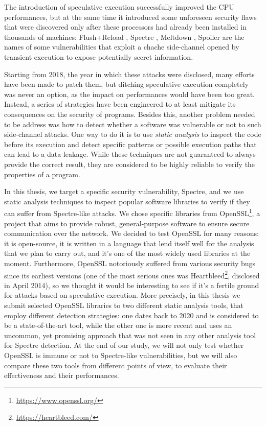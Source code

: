 \documentclass[12pt,a4paper]{book}
\theoremstyle{definition}
\begin{document}
	The introduction of speculative execution successfully improved the CPU performances, but at the same time it introduced some unforeseen security flaws that were discovered only after these processors had already been installed in thousands of machines: Flush+Reload \cite{Yarom2014}, Spectre \cite{Kocher2019}, Meltdown \cite{Lipp2018}, Spoiler \cite{Islam2019} are the names of some vulnerabilities that exploit a chache side-channel opened by transient execution to expose potentially secret information.
	
	Starting from 2018, the year in which these attacks were disclosed, many efforts have been made to patch them, but ditching speculative execution completely was never an option, as the impact on performances would have been too great. Instead, a series of strategies have been engineered to at least mitigate its consequences on the security of programs. Besides this, another problem needed to be address was how to detect whether a software was vulnerable or not to such side-channel attacks. One way to do it is to use \textit{static analysis} to inspect the code before its execution and detect specific patterns or possible execution paths that can lead to a data leakage. While these techniques are not guaranteed to always provide the correct result, they are considered to be highly reliable to verify the properties of a program.
	
	In this thesis, we target a specific security vulnerability, Spectre, and we use static analysis techniques to inspect popular software libraries to verify if they can suffer from Spectre-like attacks. We chose specific libraries from OpenSSL\footnote{\url{https://www.openssl.org/}}, a project that aims to provide robust, general-purpose software to ensure secure communication over the network. We decided to test OpenSSL for many reasons: it is open-source, it is written in a language that lend itself well for the analysis that we plan to carry out, and it's one of the most widely used libraries at the moment. Furthermore, OpenSSL notoriously suffered from various security bugs since its earliest versions (one of the most serious ones was Heartbleed\footnote{\url{https://heartbleed.com/}}, disclosed in April 2014), so we thought it would be interesting to see if it's a fertile ground for attacks based on speculative execution. More precisely, in this thesis we submit selected OpenSSL libraries to two different static analysis tools, that employ different detection strategies: one dates back to 2020 and is considered to be a state-of-the-art tool, while the other one is more recent and uses an uncommon, yet promising approach that was not seen in any other analysis tool for Spectre detection. At the end of our study, we will not only test whether OpenSSL is immune or not to Spectre-like vulnerabilities, but we will also compare these two tools from different points of view, to evaluate their effectiveness and their performances.
	
\end{document}
